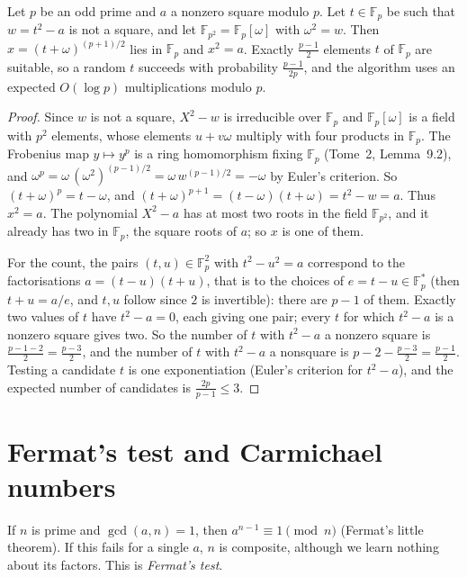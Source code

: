 \begin{theorem}[Cipolla]\label{thm:cipolla}
Let $p$ be an odd prime and $a$ a nonzero square modulo $p$. Let $t\in\mathbb F_p$ be such that $w=t^2-a$ is not a square, and let $\mathbb F_{p^2}=\mathbb F_p[\omega]$ with $\omega^2=w$. Then $x=(t+\omega)^{(p+1)/2}$ lies in $\mathbb F_p$ and $x^2=a$. Exactly $\frac{p-1}2$ elements $t$ of $\mathbb F_p$ are suitable, so a random $t$ succeeds with probability $\frac{p-1}{2p}$,
and the algorithm uses an expected $O(\log p)$ multiplications modulo $p$.
\end{theorem}
\begin{proof}
Since $w$ is not a square, $X^2-w$ is irreducible over $\mathbb F_p$ and $\mathbb F_p[\omega]$ is a field with $p^2$ elements, whose elements $u+v\omega$ multiply with four products in $\mathbb F_p$. The Frobenius map $y\mapsto y^p$ is a ring homomorphism fixing $\mathbb F_p$ (Tome~2, Lemma~9.2), and $\omega^p=\omega\,(\omega^2)^{(p-1)/2}=\omega\,w^{(p-1)/2}=-\omega$ by Euler's criterion.
So $(t+\omega)^p=t-\omega$, and $(t+\omega)^{p+1}=(t-\omega)(t+\omega)=t^2-w=a$. Thus $x^2=a$. The polynomial $X^2-a$ has at most two roots in the field $\mathbb F_{p^2}$, and it already has two in $\mathbb F_p$, the square roots of $a$; so $x$ is one of them.

For the count, the pairs $(t,u)\in\mathbb F_p^2$ with $t^2-u^2=a$ correspond to the factorisations $a=(t-u)(t+u)$, that is to the choices of $e=t-u\in\mathbb F_p^*$ (then $t+u=a/e$, and $t,u$ follow since $2$ is invertible): there are $p-1$ of them. Exactly two values of $t$ have $t^2-a=0$, each giving one pair; every $t$ for which $t^2-a$ is a nonzero square gives two. So the number of $t$
with $t^2-a$ a nonzero square is $\frac{p-1-2}2=\frac{p-3}2$, and the number of $t$ with $t^2-a$ a nonsquare is $p-2-\frac{p-3}2=\frac{p-1}2$. Testing a candidate $t$ is one exponentiation (Euler's criterion for $t^2-a$), and the expected number of candidates is $\frac{2p}{p-1}\le3$.
\end{proof}

\section{Fermat's test and Carmichael numbers}\label{sec:fermat}

If $n$ is prime and $\gcd(a,n)=1$, then $a^{n-1}\equiv1\pmod n$ (Fermat's little theorem). If this fails for a single $a$, $n$ is composite, although we learn nothing about its factors. This is \emph{Fermat's test}.

